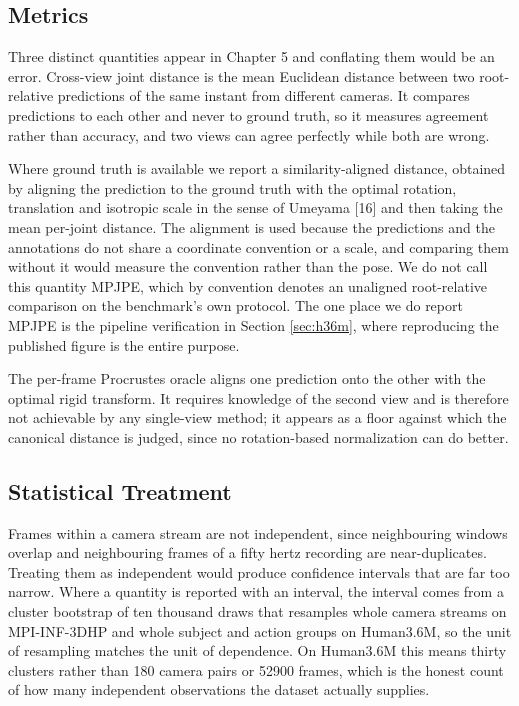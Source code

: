 \documentclass[12pt,a4paper]{report}
\begin{document}
\subsection{Metrics}

Three distinct quantities appear in Chapter 5 and conflating them would be an error. Cross-view joint distance is the mean Euclidean distance between two root-relative predictions of the same instant from different cameras. It compares predictions to each other and never to ground truth, so it measures agreement rather than accuracy, and two views can agree perfectly while both are wrong.

Where ground truth is available we report a similarity-aligned distance, obtained by aligning the prediction to the ground truth with the optimal rotation, translation and isotropic scale in the sense of Umeyama [16] and then taking the mean per-joint distance. The alignment is used because the predictions and the annotations do not share a coordinate convention or a scale, and comparing them without it would measure the convention rather than the pose. We do not call this quantity MPJPE, which by convention denotes an unaligned root-relative comparison on the benchmark's own protocol. The one place we do report MPJPE is the pipeline verification in Section \ref{sec:h36m}, where reproducing the published figure is the entire purpose.

The per-frame Procrustes oracle aligns one prediction onto the other with the optimal rigid transform. It requires knowledge of the second view and is therefore not achievable by any single-view method; it appears as a floor against which the canonical distance is judged, since no rotation-based normalization can do better.

\subsection{Statistical Treatment}

Frames within a camera stream are not independent, since neighbouring windows overlap and neighbouring frames of a fifty hertz recording are near-duplicates. Treating them as independent would produce confidence intervals that are far too narrow. Where a quantity is reported with an interval, the interval comes from a cluster bootstrap of ten thousand draws that resamples whole camera streams on MPI-INF-3DHP and whole subject and action groups on Human3.6M, so the unit of resampling matches the unit of dependence. On Human3.6M this means thirty clusters rather than 180 camera pairs or 52900 frames, which is the honest count of how many independent observations the dataset actually supplies.
\end{document}
